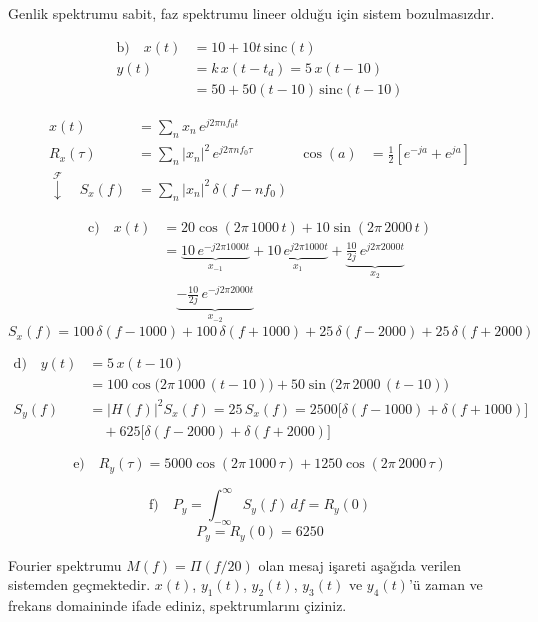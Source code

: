 \documentclass[11pt,a4paper]{article}
\begin{document}
Genlik spektrumu sabit, faz spektrumu lineer olduğu için sistem bozulmasızdır.

\begin{align*}
\text{b)}\quad x(t)&=10+10t\,\mathrm{sinc}(t)\\
y(t)&=k\,x(t-t_d)=5\,x(t-10)\\
&=50+50(t-10)\,\mathrm{sinc}(t-10)
\end{align*}

\begin{align*}
x(t)&=\sum_n x_n\,e^{j2\pi n f_0 t}\\
R_x(\tau)&=\sum_n |x_n|^2\,e^{j2\pi n f_0 \tau} & \cos(a)&=\tfrac12\left[e^{-ja}+e^{ja}\right]\\
\overset{\mathcal F}{\downarrow}\quad S_x(f)&=\sum_n |x_n|^2\,\delta(f-nf_0)
\end{align*}

\begin{align*}
\text{c)}\quad x(t)&=20\cos(2\pi\,1000\,t)+10\sin(2\pi\,2000\,t)\\
&=\underbrace{10\,e^{-j2\pi 1000t}}_{x_{-1}}+\underbrace{10\,e^{j2\pi 1000t}}_{x_{1}}+\underbrace{\frac{10}{2j}\,e^{j2\pi 2000t}}_{x_{2}}\\
&\quad\underbrace{-\frac{10}{2j}\,e^{-j2\pi 2000t}}_{x_{-2}}
\end{align*}
\[ S_x(f)=100\,\delta(f-1000)+100\,\delta(f+1000)+25\,\delta(f-2000)+25\,\delta(f+2000) \]

\begin{align*}
\text{d)}\quad y(t)&=5\,x(t-10)\\
&=100\cos\bigl(2\pi\,1000\,(t-10)\bigr)+50\sin\bigl(2\pi\,2000\,(t-10)\bigr)\\
S_y(f)&=|H(f)|^2S_x(f)=25\,S_x(f)=2500\bigl[\delta(f-1000)+\delta(f+1000)\bigr]\\
&\quad+625\bigl[\delta(f-2000)+\delta(f+2000)\bigr]
\end{align*}

\[ \text{e)}\quad R_y(\tau)=5000\cos(2\pi\,1000\,\tau)+1250\cos(2\pi\,2000\,\tau) \]

\[ \text{f)}\quad P_y=\int_{-\infty}^{\infty}S_y(f)\,df=R_y(0) \]
\[ P_y=R_y(0)=6250 \]

\begin{ornek}
Fourier spektrumu $M(f)=\Pi(f/20)$ olan mesaj işareti aşağıda verilen sistemden geçmektedir. $x(t)$, $y_1(t)$, $y_2(t)$, $y_3(t)$ ve $y_4(t)$'ü zaman ve frekans domaininde ifade ediniz, spektrumlarını çiziniz.
\end{ornek}
\end{document}
